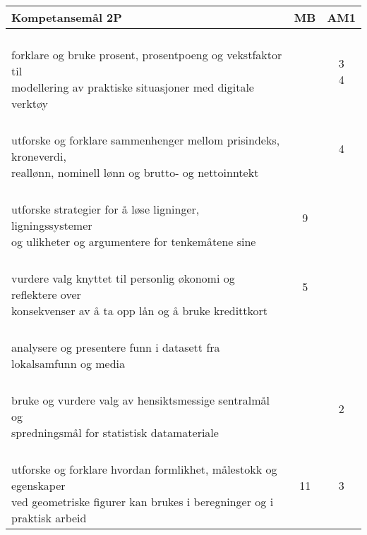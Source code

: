 \documentclass{article}
\begin{document}
\begin{center}
	\begin{tabular}{p{10.5cm} | c | c |} 
		\textbf{Kompetansemål 2P} &	MB & AM1 \\ \hline
		\shortstack[l]{\\ forklare og bruke prosent, prosentpoeng og vekstfaktor til\\ modellering av praktiske situasjoner med digitale verktøy
		} &\shortstack{\\{}} & \shortstack{3\\4} \\ \hline
		
		
		\shortstack[l]{\\ utforske og forklare sammenhenger mellom prisindeks, kroneverdi,\\ reallønn, nominell lønn og brutto- og nettoinntekt
		} &\shortstack{} &\shortstack{4\\{}} \\ \hline
		
		\shortstack[l]{\\ utforske strategier for å løse ligninger, ligningssystemer \\ og ulikheter og argumentere for tenkemåtene sine
		} &\shortstack{9\\{}} &\shortstack{} \\ \hline
		
		\shortstack[l]{\\ vurdere valg knyttet til personlig økonomi og reflektere over\\ konsekvenser av å ta opp lån og å bruke kredittkort
		} &\shortstack{5\\{}} &\shortstack{} \\ \hline
		
		\shortstack[l]{\\ analysere og presentere funn i datasett fra lokalsamfunn og media
		} &\shortstack{\\{}} &\shortstack{2} \\ \hline
		
		\shortstack[l]{\\ bruke og vurdere valg av hensiktsmessige sentralmål og\\ spredningsmål for statistisk datamateriale
		} &\shortstack{ \\{} \\{}} &\shortstack{2\\{}} \\ \hline
		
		\shortstack[l]{\\ utforske og forklare hvordan formlikhet, målestokk og egenskaper\\ ved geometriske figurer kan brukes i beregninger og i praktisk arbeid
		} &\shortstack{11\\{}} &\shortstack{3\\{}} \\ \hline
	\end{tabular}
\end{center} 
\newpage
\end{document}
